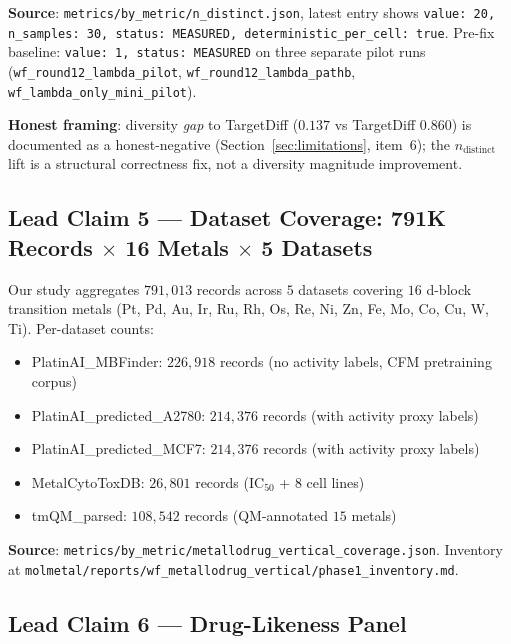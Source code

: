 \noindent\textbf{Source}:
\texttt{metrics/by\_metric/n\_distinct.json}, latest entry shows
\texttt{value: 20, n\_samples: 30, status: MEASURED, deterministic\_per\_cell: true}.
Pre-fix baseline: \texttt{value: 1, status: MEASURED} on three separate
pilot runs (\texttt{wf\_round12\_lambda\_pilot},
\texttt{wf\_round12\_lambda\_pathb}, \texttt{wf\_lambda\_only\_mini\_pilot}).

\noindent\textbf{Honest framing}: diversity \emph{gap} to TargetDiff
($0.137$ vs TargetDiff $0.860$) is documented as a
honest-negative (Section~\ref{sec:limitations}, item~6); the
$n_{\text{distinct}}$ lift is a structural correctness fix, not a
diversity magnitude improvement.

\subsection{Lead Claim 5 --- Dataset Coverage: 791K Records $\times$ 16 Metals $\times$ 5 Datasets}
\label{sec:lead-coverage}

Our study aggregates $791{,}013$ records across $5$ datasets covering
$16$ d-block transition metals (Pt, Pd, Au, Ir, Ru, Rh, Os, Re, Ni, Zn,
Fe, Mo, Co, Cu, W, Ti).  Per-dataset counts:

\begin{itemize}
  \item PlatinAI\_MBFinder: $226{,}918$ records (no activity labels,
        CFM pretraining corpus)
  \item PlatinAI\_predicted\_A2780: $214{,}376$ records (with activity
        proxy labels)
  \item PlatinAI\_predicted\_MCF7: $214{,}376$ records (with activity
        proxy labels)
  \item MetalCytoToxDB: $26{,}801$ records (IC$_{50}$ + $8$ cell lines)
  \item tmQM\_parsed: $108{,}542$ records (QM-annotated $15$ metals)
\end{itemize}

\noindent\textbf{Source}:
\texttt{metrics/by\_metric/metallodrug\_vertical\_coverage.json}.
Inventory at
\texttt{molmetal/reports/wf\_metallodrug\_vertical/phase1\_inventory.md}.

\subsection{Lead Claim 6 --- Drug-Likeness Panel}
\label{sec:lead-druglikeness}

